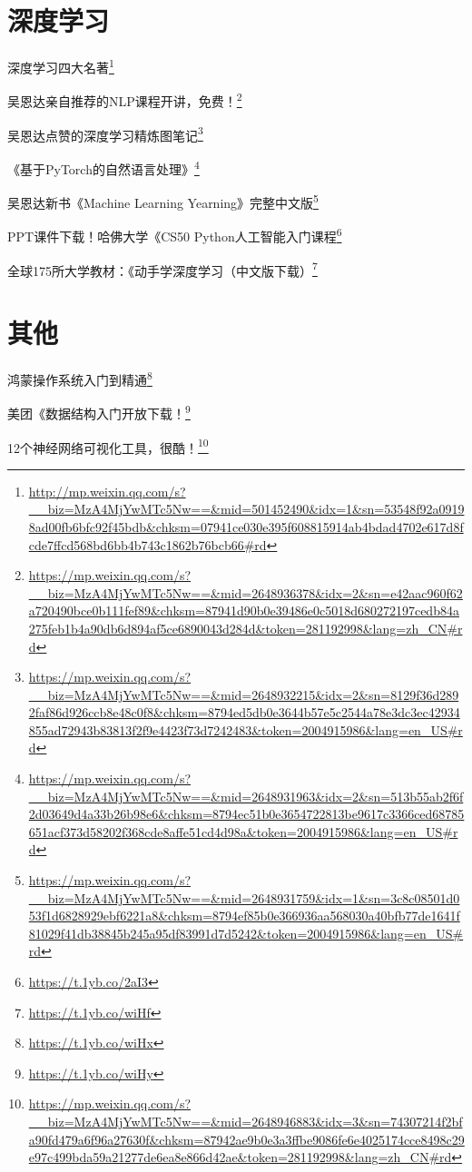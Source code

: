 \documentclass[]{ctexbook}
\renewcommand{\href}[2]{#2\footnote{\url{#1}}}
\begin{document}
\hypertarget{ux6df1ux5ea6ux5b66ux4e60-2}{%
\section{深度学习}\label{ux6df1ux5ea6ux5b66ux4e60-2}}

\href{http://mp.weixin.qq.com/s?__biz=MzA4MjYwMTc5Nw==\&mid=501452490\&idx=1\&sn=53548f92a09198ad00fb6bfc92f45bdb\&chksm=07941ce030e395f608815914ab4bdad4702e617d8fcde7ffcd568bd6bb4b743c1862b76bcb66\#rd}{深度学习四大名著}

\href{https://mp.weixin.qq.com/s?__biz=MzA4MjYwMTc5Nw==\&mid=2648936378\&idx=2\&sn=e42aac960f62a720490bce0b111fef89\&chksm=87941d90b0e39486e0c5018d680272197cedb84a275feb1b4a90db6d894af5ce6890043d284d\&token=281192998\&lang=zh_CN\#rd}{吴恩达亲自推荐的NLP课程开讲，免费！}

\href{https://mp.weixin.qq.com/s?__biz=MzA4MjYwMTc5Nw==\&mid=2648932215\&idx=2\&sn=8129f36d2892faf86d926ccb8e48c0f8\&chksm=8794ed5db0e3644b57e5c2544a78e3dc3ec42934855ad72943b83813f2f9e4423f73d7242483\&token=2004915986\&lang=en_US\#rd}{吴恩达点赞的深度学习精炼图笔记}

\href{https://mp.weixin.qq.com/s?__biz=MzA4MjYwMTc5Nw==\&mid=2648931963\&idx=2\&sn=513b55ab2f6f2d03649d4a33b26b98e6\&chksm=8794ec51b0e3654722813be9617c3366ced68785651acf373d58202f368cde8affe51cd4d98a\&token=2004915986\&lang=en_US\#rd}{《基于PyTorch的自然语言处理》}

\href{https://mp.weixin.qq.com/s?__biz=MzA4MjYwMTc5Nw==\&mid=2648931759\&idx=1\&sn=3c8c08501d053f1d6828929ebf6221a8\&chksm=8794ef85b0e366936aa568030a40bfb77de1641f81029f41db38845b245a95df83991d7d5242\&token=2004915986\&lang=en_US\#rd}{吴恩达新书《Machine Learning Yearning》完整中文版}

\href{https://t.1yb.co/2aI3}{PPT课件下载！哈佛大学《CS50 Python人工智能入门课程}

\href{https://t.1yb.co/wiHf}{全球175所大学教材：《动手学深度学习（中文版下载）}

\hypertarget{ux5176ux4ed6-5}{%
\section{其他}\label{ux5176ux4ed6-5}}

\href{https://t.1yb.co/wiHx}{鸿蒙操作系统入门到精通}

\href{https://t.1yb.co/wiHy}{美团《数据结构入门开放下载！}

\href{https://mp.weixin.qq.com/s?__biz=MzA4MjYwMTc5Nw==\&mid=2648946883\&idx=3\&sn=74307214f2bfa90fd479a6f96a27630f\&chksm=87942ae9b0e3a3ffbe9086fe6e4025174cce8498c29e97c499bda59a21277de6ea8e866d42ae\&token=281192998\&lang=zh_CN\#rd}{12个神经网络可视化工具，很酷！}
\end{document}
